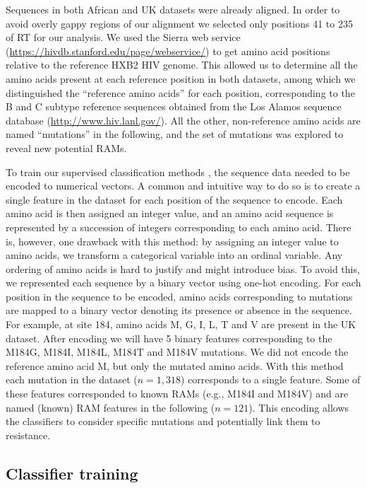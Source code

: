 \documentclass[
  11pt,
  twoside,
  BCOR=10mm,
  listof=totoc]{scrbook}
\begin{document}
Sequences in both African and UK datasets were already aligned. In order
to avoid overly gappy regions of our alignment we selected only
positions 41 to 235 of RT for our analysis. We used the Sierra web
service (\url{https://hivdb.stanford.edu/page/webservice/}) to get amino
acid positions relative to the reference HXB2 HIV genome. This allowed
us to determine all the amino acids present at each reference position
in both datasets, among which we distinguished the ``reference amino
acids'' for each position, corresponding to the B and C subtype reference
sequences obtained from the Los Alamos sequence database
(\url{http://www.hiv.lanl.gov/}). All the other, non-reference amino acids
are named ``mutations'' in the following, and the set of mutations was
explored to reveal new potential RAMs.

To train our supervised classification methods
\autocite{tibshiraniRegressionShrinkageSelection1996,brierVERIFICATIONFORECASTSEXPRESSED1950,gascuelTwelveNumericalSymbolic1998},
the sequence data needed to be encoded to numerical vectors. A common
and intuitive way to do so is to create a single feature in the dataset
for each position of the sequence to encode. Each amino acid is then
assigned an integer value, and an amino acid sequence is represented by
a succession of integers corresponding to each amino acid. There is,
however, one drawback with this method: by assigning an integer value to
amino acids, we transform a categorical variable into an ordinal
variable. Any ordering of amino acids is hard to justify and might
introduce bias. To avoid this, we represented each sequence by a binary
vector using one-hot encoding. For each position in the sequence to be
encoded, amino acids corresponding to mutations are mapped to a binary
vector denoting its presence or absence in the sequence. For example, at
site 184, amino acids M, G, I, L, T and V are present in the UK dataset.
After encoding we will have 5 binary features corresponding to the
M184G, M184I, M184L, M184T and M184V mutations. We did not encode the
reference amino acid M, but only the mutated amino acids. With this
method each mutation in the dataset (\(n=1,318\)) corresponds to a single
feature. Some of these features corresponded to known RAMs (e.g., M184I
and M184V) and are named (known) RAM features in the following
(\(n=121\)). This encoding allows the classifiers to consider specific
mutations and potentially link them to resistance.

\hypertarget{classifier-training}{%
\subsection{Classifier training}\label{classifier-training}}
\end{document}
